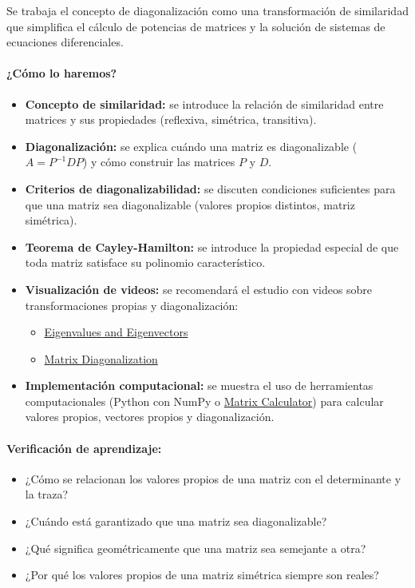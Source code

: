 \documentclass[a4,11pt]{aleph-notas}
\begin{document}
Se trabaja el concepto de diagonalización como una transformación de similaridad que simplifica el cálculo de potencias de matrices y la solución de sistemas de ecuaciones diferenciales.

\paragraph{¿Cómo lo haremos?}  
\begin{itemize}[leftmargin=*]  
    \item \textbf{Concepto de similaridad:} se introduce la relación de similaridad entre matrices y sus propiedades (reflexiva, simétrica, transitiva).
    \item \textbf{Diagonalización:} se explica cuándo una matriz es diagonalizable ($A = P^{-1}DP$) y cómo construir las matrices $P$ y $D$.
    \item \textbf{Criterios de diagonalizabilidad:} se discuten condiciones suficientes para que una matriz sea diagonalizable (valores propios distintos, matriz simétrica).
    \item \textbf{Teorema de Cayley-Hamilton:} se introduce la propiedad especial de que toda matriz satisface su polinomio característico.
    \item \textbf{Visualización de videos:} se recomendará el estudio con videos sobre transformaciones propias y diagonalización: 
    \begin{itemize}
        \item \href{https://youtu.be/PFDu9oVAE-g}{Eigenvalues and Eigenvectors}
        \item \href{https://youtu.be/e50Bd-NcJ6c}{Matrix Diagonalization}
    \end{itemize}  
    \item \textbf{Implementación computacional:} se muestra el uso de herramientas computacionales (Python con NumPy o \href{https://matrixcalc.org/es/}{Matrix Calculator}) para calcular valores propios, vectores propios y diagonalización.
\end{itemize}  

\paragraph{Verificación de aprendizaje:}  
\begin{itemize}[leftmargin=*]  
    \item ¿Cómo se relacionan los valores propios de una matriz con el determinante y la traza?  
    \item ¿Cuándo está garantizado que una matriz sea diagonalizable?  
    \item ¿Qué significa geométricamente que una matriz sea semejante a otra?  
    \item ¿Por qué los valores propios de una matriz simétrica siempre son reales?  
\end{itemize}  
\end{document}
